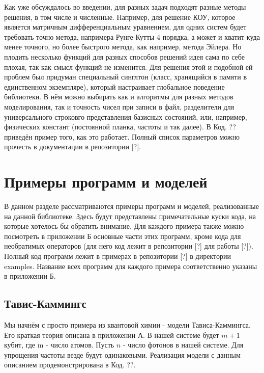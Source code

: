 \documentclass[aps,twocolumn,pra,showpacs,amsmath,amssymb,showkeys,10pt]{revtex4-2}
\begin{document}
    Как уже обсуждалось во введении, для разных задач подходят разные методы решения, в том числе и численные. Например, для решение КОУ, которое является матричным дифференциальным уравнением, для одних 
    систем будет требовать точно метода, напримера Рунге-Кутты 4 порядка, а может и хватит куда менее точного, но более быстрого метода, как например, метода Эйлера. Но плодить несколько функций для 
    разных способов решений идея сама по себе плохая, так как смысл функций не изменится. Для решения этой и подобной ей проблем был придуман специальный синглтон (класс, хранящийся в памяти в 
    единственном экземпляре), который настраивает глобальное поведение библиотеки. В нём можно выбирать как и алгоритмы для разных методов моделирования, так и точность чисел при записи в файл, 
    разделители для универсального строковго представления базисных состояний, или, например, физических констант (постоянной планка, частоты и так далее). В Код. ?? приведён пример того, как это 
    работает. Полный список параметров можно прочесть в документации в репозитории [?].

    \section{Примеры программ и моделей}

    В данном разделе рассматриваются примеры программ и моделей, реализованные на данной библиотеке. Здесь будут представлены примечательные куски кода, на которые хотелось бы обратить внимание. 
    Для каждого примера также можно посмотреть в приложении Б основные части этих программ, кроме кода для необратимых операторов (для него код лежит в репозитории [?] для работы [?]). Полный код 
    программ лежит в примерах в репозитории [?] в директории examples. Название всех программ для каждого примера соответственно указаны в приложении Б.
    
    \subsection{Тавис-Каммингс}

    Мы начнём с просто примера из квантовой химии - модели Тависа-Каммингса. Его краткая теория описана в приложении А. В нашей системе будет $m + 1$ кубит, где m - число атомов. Пусть $n$ - 
    число фотонов в нашей системе. Для упрощения частоты везде будут одинаковыми. Реализация модели с данным описанием продемонстрирована в Код. ??. 
\end{document}
